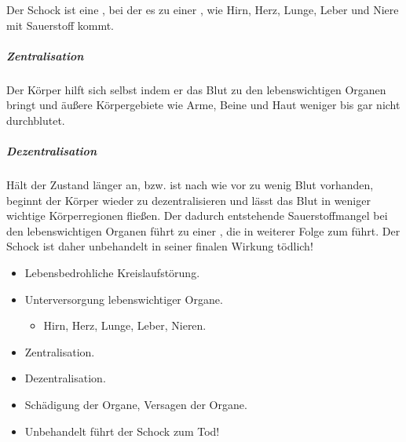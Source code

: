 {
Der Schock ist eine , bei der es zu einer
, wie Hirn,
Herz, Lunge, Leber und Niere mit Sauerstoff kommt. 

\subparagraph{Zentralisation} Der Körper hilft sich
selbst indem er das Blut zu den lebenswichtigen Organen bringt und äußere Körpergebiete wie Arme,
Beine und Haut weniger bis gar nicht durchblutet. 

\subparagraph{Dezentralisation} Hält
der Zustand länger an, bzw. ist nach wie vor zu wenig Blut vorhanden, beginnt
der Körper wieder zu dezentralisieren und lässt das Blut in weniger
wichtige Körperregionen fließen. Der dadurch entstehende Sauerstoffmangel
bei den lebenswichtigen Organen führt zu einer , die
in weiterer Folge zum  führt. Der Schock
ist daher unbehandelt in seiner finalen Wirkung tödlich!
}{
\begin{itemize}
  \item Lebensbedrohliche Kreislaufstörung.
  \item Unterversorgung lebenswichtiger Organe.
  \begin{itemize}
    \item Hirn, Herz, Lunge, Leber, Nieren.
  \end{itemize}
  \item Zentralisation.
  \item Dezentralisation.
  \item Schädigung der Organe, Versagen der Organe.
  \item Unbehandelt führt der Schock zum Tod!
\end{itemize}
}{}{}{}




